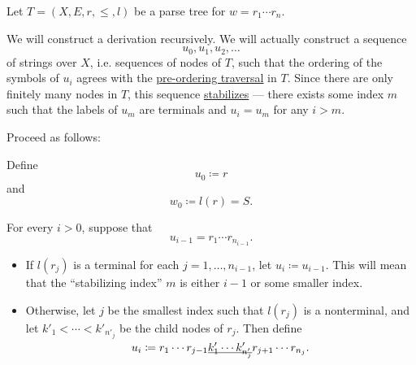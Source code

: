 \begin{algorithm}\label{alg:parse_tree_to_leftmost_derivation}
  Let \( T = (X, E, r, \leq, l) \) be a parse tree for \( w = r_1 \cdots r_n \).

  We will construct a derivation recursively. We will actually construct a sequence
  \begin{equation*}
    u_0, u_1, u_2, \ldots
  \end{equation*}
  of strings over \( X \), i.e. sequences of nodes of \( T \), such that the ordering of the symbols of \( u_i \) agrees with the \hyperref[def:traversal_ordering]{pre-ordering traversal} in \( T \). Since there are only finitely many nodes in \( T \), this sequence \hyperref[def:stabilizing_sequence]{stabilizes} --- there exists some index \( m \) such that the labels of \( u_m \) are terminals and \( u_i = u_m \) for any \( i > m \).

  Proceed as follows:
  \begin{thmenum}
     Define
    \begin{equation*}
      u_0 \coloneqq r
    \end{equation*}
    and
    \begin{equation*}
      w_0 \coloneqq l(r) = S.
    \end{equation*}

     For every \( i > 0 \), suppose that
    \begin{equation*}
      u_{i-1} = r_1 \cdots r_{n_{i-1}}.
    \end{equation*}

    \begin{itemize}
      \item If \( l(r_j) \) is a terminal for each \( j = 1, \ldots, n_{i-1} \), let \( u_i \coloneqq u_{i-1} \). This will mean that the \enquote{stabilizing index} \( m \) is either \( i - 1 \) or some smaller index.

      \item Otherwise, let \( j \) be the smallest index such that \( l(r_j) \) is a nonterminal, and let \( k'_1 < \cdots < k'_{n'_j} \) be the child nodes of \( r_j \). Then define
      \begin{equation*}
        u_i \coloneqq r_1 \cdots r_{j-1} \underline{\smash{ k'_1 \cdots k'_{n'_j} }} r_{j+1} \cdots r_{n_j}.
      \end{equation*}


\end{itemize}
\end{thmenum}
\end{algorithm}
